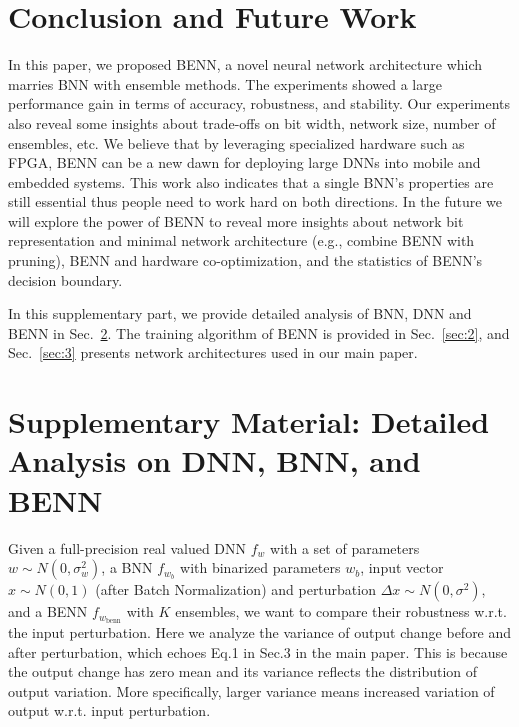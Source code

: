 \documentclass[10pt,twocolumn,letterpaper]{article}
\begin{document}
\section{Conclusion and Future Work}

In this paper, we proposed BENN, a novel neural network architecture which marries BNN with ensemble methods. The experiments showed a large performance gain in terms of accuracy, robustness, and stability. Our experiments also reveal some insights about trade-offs on bit width, network size, number of ensembles, etc. We believe that by leveraging specialized hardware such as FPGA, BENN can be a new dawn for deploying large DNNs into mobile and embedded systems. This work also indicates that a single BNN's properties are still essential thus people need to work hard on both directions. In the future we will explore the power of BENN to reveal more insights about network bit representation and minimal network architecture (e.g., combine BENN with pruning), BENN and hardware co-optimization, and the statistics of BENN's decision boundary.

\small
\nocite{*}



\newpage
In this supplementary part, we provide detailed analysis of BNN, DNN and BENN in Sec.~\ref{sec:1}. The training algorithm of BENN is provided in Sec.~\ref{sec:2}, and Sec.~\ref{sec:3} presents network architectures used in our main paper.

\section{Supplementary Material: Detailed Analysis on DNN, BNN, and BENN}
\label{sec:1}

Given a full-precision real valued DNN $f_{w}$ with a set of parameters $w \sim N(0,\sigma_{w}^{2})$, a BNN $f_{w_{b}}$ with binarized parameters $w_{b}$, input vector $x \sim N(0,1)$ (after Batch Normalization) and perturbation $\Delta x \sim N(0,\sigma^{2})$, and a BENN $f_{w_{\text{benn}}}$ with $K$ ensembles, we want to compare their robustness w.r.t. the input perturbation. Here we analyze the variance of output change before and after perturbation, which echoes Eq.1 in Sec.3 in the main paper. This is because the output change has zero mean and its variance reflects the distribution of output variation. More specifically, larger variance means increased variation of output w.r.t. input perturbation.
\end{document}
